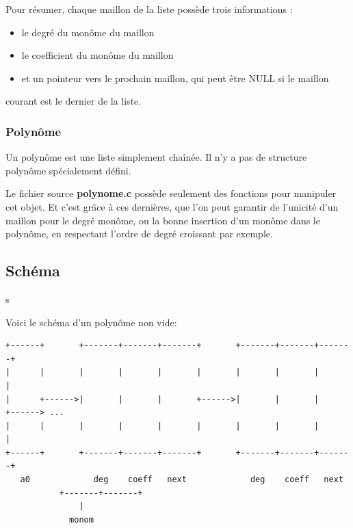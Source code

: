 \documentclass[11pt]{article}
\begin{document}
Pour résumer, chaque maillon de la liste possède trois informations :
\begin{itemize}
\item le degré du monôme du maillon
\item le coefficient du monôme du maillon
\item et un pointeur vers le prochain maillon, qui peut être NULL si le maillon
\end{itemize}
courant est le dernier de la liste.


\subsubsection{Polynôme}
\label{sec:orgee27d91}

Un polynôme est une liste simplement chaînée. Il n'y a pas de structure
polynôme spécialement défini.

Le fichier source \textbf{polynome.c} possède seulement des fonctions pour manipuler cet
objet. Et c'est grâce à ces dernières, que l'on peut garantir de l'unicité d'un
maillon pour le degré monôme, ou la bonne insertion d'un monôme dans le
polynôme, en respectant l'ordre de degré croissant par exemple.

\subsection{Schéma}
\label{sec:org17e4438}
s

Voici le schéma d'un polynôme non vide:
\begin{verbatim}
+------+       +-------+-------+-------+       +-------+-------+-------+
|      |       |       |       |       |       |       |       |       |
|      +------>|       |       |       +------>|       |       |       +------> ...
|      |       |       |       |       |       |       |       |       |
+------+       +-------+-------+-------+       +-------+-------+-------+
   a0	          deg    coeff   next             deg    coeff   next
	       +-------+-------+		    
		       |			    
		     monom
\end{verbatim}
\end{document}
